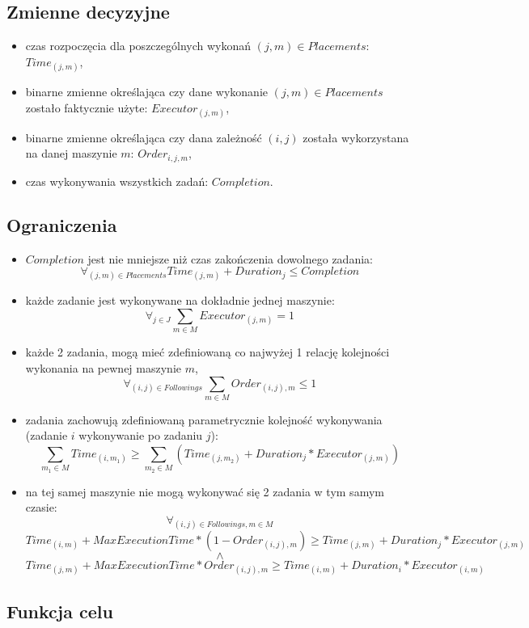 \documentclass[polish,12pt,titlepage]{article}
\begin{document}
\subsection{Zmienne decyzyjne}
\begin{itemize}
	\item czas rozpoczęcia dla poszczególnych wykonań $(j,m) \in Placements$: $Time_{(j,m)}$,
	\item binarne zmienne określająca czy dane wykonanie $(j,m) \in Placements$ zostało faktycznie użyte: $Executor_{(j,m)}$,
	\item binarne zmienne określająca czy dana zależność $(i,j)$ została wykorzystana na danej maszynie $m$: $Order_{i,j,m}$,
	\item czas wykonywania wszystkich zadań: $Completion$.
\end{itemize}

\subsection{Ograniczenia}
\begin{itemize}
	\item $Completion$ jest nie mniejsze niż czas zakończenia dowolnego zadania:
	$$\forall_{(j,m) \in Placements} Time_{(j,m)} + Duration_{j} \leq Completion$$
	\item każde zadanie jest wykonywane na dokładnie jednej maszynie:
	$$\forall_{j \in J} \sum\limits_{m \in M} Executor_{(j,m)} = 1$$
	\item każde 2 zadania, mogą mieć zdefiniowaną co najwyżej 1 relację kolejności wykonania na pewnej maszynie $m$,
	$$\forall_{(i,j) \in Followings} \sum\limits_{m \in M} Order_{(i,j),m} \leq 1$$
	\item zadania zachowują zdefiniowaną parametrycznie kolejność wykonywania (zadanie $i$ wykonywanie po zadaniu $j$):
	$$\sum\limits_{m_1 \in M} Time_{(i,m_1)} \geq \sum\limits_{m_2 \in M} ( Time_{(j,m_2)} + Duration_j * Executor_{(j,m)})$$
	\item na tej samej maszynie nie mogą wykonywać się 2 zadania w tym samym czasie:
	$$\forall_{(i,j) \in Followings, m \in M}$$
	$$Time_{(i,m)} + MaxExecutionTime *(1-Order_{(i,j),m}) \geq Time_{(j,m)} + Duration_j * Executor_{(j,m)}$$
	$$\land$$
	 $$Time_{(j,m)} + MaxExecutionTime *Order_{(i,j),m} \geq Time_{(i,m)} + Duration_i * Executor_{(i,m)}$$
\end{itemize}

\subsection{Funkcja celu}
\end{document}
